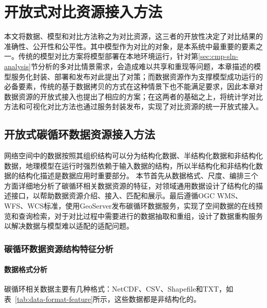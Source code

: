 \chapter{开放式对比资源接入方法}
本文将数据、模型和对比方法称之为对比资源，这三者的开放性决定了对比结果的准确性、公开性和公平性。其中模型作为对比的对象，是本系统中最重要的要素之一。传统的模型对比方案将模型部署在本地环境运行，针对第\ref{sec:cmp-sln-analysis}节分析的多对比情景需求，会造成难以共享和重现等问题，本章描述的模型服务化封装、部署和发布对此提出了对策；而数据资源作为支撑模型成功运行的必备要素，传统的基于数据拷贝的方式在这种情景下也不能满足要求，因此本章对数据资源的开放式接入也提出了相应的方案；在这两者的基础之上，将统计学对比方法和可视化对比方法也通过服务封装发布，实现了对比资源的统一开放式接入。

\section{开放式碳循环数据资源接入方法}
\label{sec:data-joinup}
网络空间中的数据按照其组织结构可以分为结构化数据、半结构化数据和非结构化数据，地理模型在运行时强烈依赖于输入数据的结构，所以半结构化和非结构化数据的结构化描述是数据应用时重要部分。
本节首先从数据格式、尺度、编排三个方面详细地分析了碳循环相关数据资源的特征，对领域通用数据设计了结构化的描述接口，以帮助数据资源介绍、接入、匹配和展示。最后遵循OGC WMS、WFS、WCS标准，使用GeoServer发布碳循环数据服务，实现了空间数据的在线预览和查询检索，对于对比过程中需要进行的数据抽取和重组，设计了数据重构服务以解决数据与模型难以适配的适配问题。

\subsection{碳循环数据资源结构特征分析}
\subsubsection{数据格式分析}
碳循环相关数据主要有几种格式：NetCDF、CSV、Shapefile和TXT，如表~\ref{tab:data-format-feature}所示，这些数据都是非结构化的。

